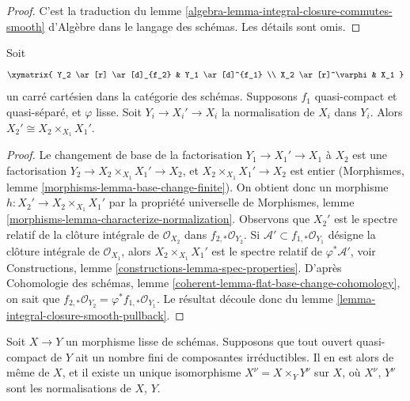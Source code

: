 \begin{proof}
C'est la traduction du
lemme \ref{algebra-lemma-integral-closure-commutes-smooth} d'Algèbre
dans le langage des schémas. Les détails sont omis.
\end{proof}

\begin{lemma}
\label{lemma-normalization-smooth-localization}
Soit
$$
\xymatrix{
Y_2 \ar[r] \ar[d]_{f_2} & Y_1 \ar[d]^{f_1} \\
X_2 \ar[r]^\varphi & X_1
}
$$
un carré cartésien dans la catégorie des schémas. Supposons $f_1$ quasi-compact
et quasi-séparé, et $\varphi$ lisse.
Soit $Y_i \to X_i' \to X_i$ la normalisation de $X_i$ dans $Y_i$.
Alors $X_2' \cong X_2 \times_{X_1} X_1'$.
\end{lemma}

\begin{proof}
Le changement de base de la factorisation $Y_1 \to X_1' \to X_1$ à $X_2$
est une factorisation $Y_2 \to X_2 \times_{X_1} X_1' \to X_2$, et
$X_2 \times_{X_1} X_1' \to X_2$ est entier
(Morphismes, lemme \ref{morphisms-lemma-base-change-finite}).
On obtient donc un morphisme
$h : X_2' \to X_2 \times_{X_1} X_1'$ par la propriété universelle de
Morphismes, lemme \ref{morphisms-lemma-characterize-normalization}.
Observons que $X_2'$ est le spectre relatif de la clôture intégrale
de $\mathcal{O}_{X_2}$ dans $f_{2, *}\mathcal{O}_{Y_2}$.
Si $\mathcal{A}' \subset f_{1, *}\mathcal{O}_{Y_1}$ désigne la clôture
intégrale de $\mathcal{O}_{X_1}$, alors $X_2 \times_{X_1} X_1'$ est le
spectre relatif de $\varphi^*\mathcal{A}'$, voir
Constructions, lemme \ref{constructions-lemma-spec-properties}.
D'après
Cohomologie des schémas, lemme \ref{coherent-lemma-flat-base-change-cohomology},
on sait que $f_{2, *}\mathcal{O}_{Y_2} = \varphi^*f_{1, *}\mathcal{O}_{Y_1}$.
Le résultat découle donc du
lemme \ref{lemma-integral-closure-smooth-pullback}.
\end{proof}

\begin{lemma}
\label{lemma-normalization-and-smooth}
Soit $X \to Y$ un morphisme lisse de schémas. Supposons que tout ouvert
quasi-compact de $Y$ ait un nombre fini de composantes irréductibles. Il en est alors
de même de $X$, et il existe un unique isomorphisme $X^\nu = X \times_Y Y^\nu$
sur $X$, où $X^\nu$, $Y^\nu$ sont les normalisations de $X$, $Y$.
\end{lemma}

